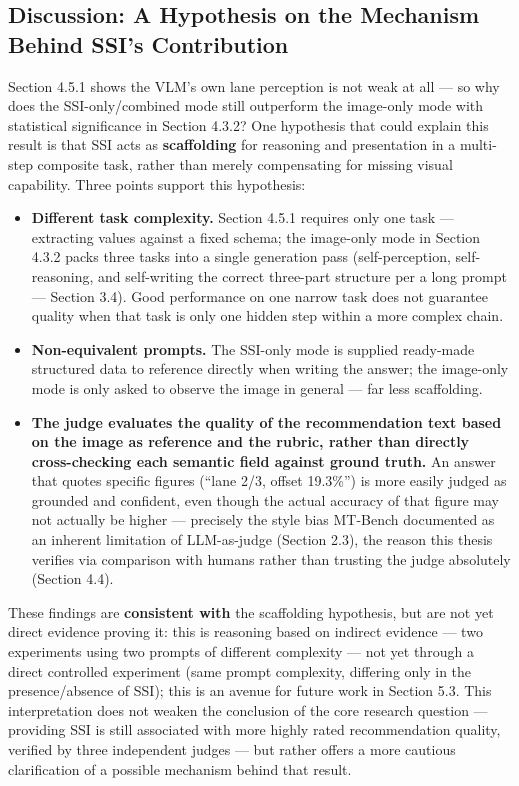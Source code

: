 \documentclass[12pt,a4paper]{report}
\begin{document}
\subsection{Discussion: A Hypothesis on the Mechanism Behind SSI's Contribution}

Section 4.5.1 shows the VLM's own lane perception is not weak at all --- so why does the SSI-only/combined mode still outperform the image-only mode with statistical significance in Section 4.3.2? One hypothesis that could explain this result is that SSI acts as \textbf{scaffolding} for reasoning and presentation in a multi-step composite task, rather than merely compensating for missing visual capability. Three points support this hypothesis:

\begin{itemize}
    \item \textbf{Different task complexity.} Section 4.5.1 requires only one task --- extracting values against a fixed schema; the image-only mode in Section 4.3.2 packs three tasks into a single generation pass (self-perception, self-reasoning, and self-writing the correct three-part structure per a long prompt --- Section 3.4). Good performance on one narrow task does not guarantee quality when that task is only one hidden step within a more complex chain.
    \item \textbf{Non-equivalent prompts.} The SSI-only mode is supplied ready-made structured data to reference directly when writing the answer; the image-only mode is only asked to observe the image in general --- far less scaffolding.
    \item \textbf{The judge evaluates the quality of the recommendation text based on the image as reference and the rubric, rather than directly cross-checking each semantic field against ground truth.} An answer that quotes specific figures (``lane 2/3, offset 19.3\%'') is more easily judged as grounded and confident, even though the actual accuracy of that figure may not actually be higher --- precisely the style bias MT-Bench documented as an inherent limitation of LLM-as-judge \cite{zheng2023mtbench} (Section 2.3), the reason this thesis verifies via comparison with humans rather than trusting the judge absolutely (Section 4.4).
\end{itemize}

These findings are \textbf{consistent with} the scaffolding hypothesis, but are not yet direct evidence proving it: this is reasoning based on indirect evidence --- two experiments using two prompts of different complexity --- not yet through a direct controlled experiment (same prompt complexity, differing only in the presence/absence of SSI); this is an avenue for future work in Section 5.3. This interpretation does not weaken the conclusion of the core research question --- providing SSI is still associated with more highly rated recommendation quality, verified by three independent judges --- but rather offers a more cautious clarification of a possible mechanism behind that result.
\end{document}
